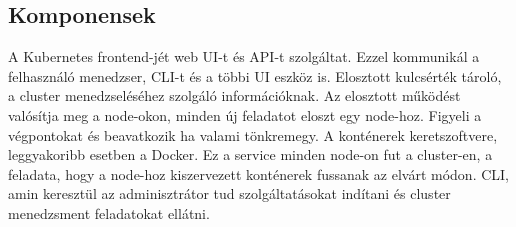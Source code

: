 \subsection{Komponensek}
A Kubernetes frontend-jét web UI-t és API-t szolgáltat. Ezzel kommunikál a felhasználó menedzser, CLI-t és a többi UI eszköz is. 
Elosztott kulcsérték tároló, a cluster menedzseléséhez szolgáló információknak.
Az elosztott működést valósítja meg a node-okon, minden új feladatot eloszt egy node-hoz.
Figyeli a végpontokat és beavatkozik ha valami tönkremegy.
A konténerek keretszoftvere, leggyakoribb esetben a Docker.
Ez a service minden node-on fut a cluster-en, a feladata, hogy a node-hoz kiszervezett konténerek fussanak az elvárt módon.
CLI, amin keresztül az adminisztrátor tud szolgáltatásokat indítani és cluster menedzsment feladatokat ellátni.


